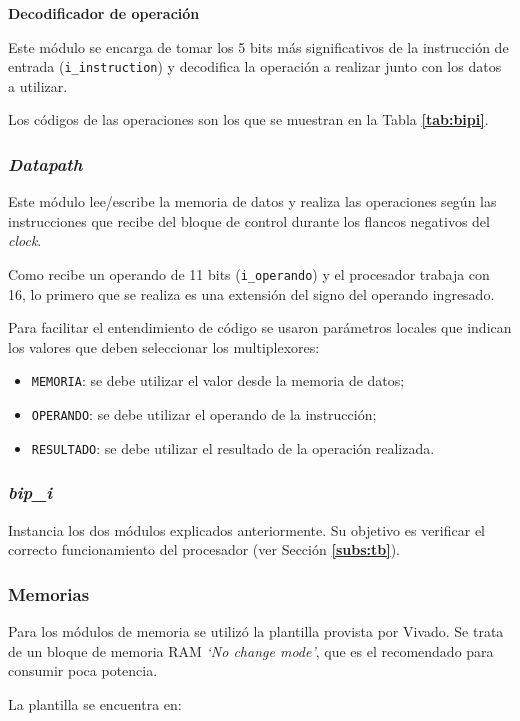 \documentclass[12pt,a4paper]{article}
\begin{document}
\textbf{Decodificador de operación}

Este módulo se encarga de tomar los 5 bits más significativos de la instrucción de entrada (\verb|i_instruction|) y decodifica la operación a realizar junto con los datos a utilizar. 

Los códigos de las operaciones son los que se muestran en la Tabla \textbf{\ref{tab:bipi}}.

\subsubsection{\emph{Datapath}}
\label{subss:datapath}
Este módulo lee/escribe la memoria de datos y realiza las operaciones según las instrucciones que recibe del bloque de control durante los flancos negativos del \emph{clock}.

Como recibe un operando de 11 bits (\verb|i_operando|) y el procesador trabaja con 16, lo primero que se realiza es una extensión del signo del operando ingresado.

Para facilitar el entendimiento de código se usaron parámetros locales que indican los valores que deben seleccionar los multiplexores:

\begin{itemize}
\item \verb|MEMORIA|: se debe utilizar el valor desde la memoria de datos;
\item \verb|OPERANDO|:  se debe utilizar el operando de la instrucción;
\item \verb|RESULTADO|: se debe utilizar el resultado de la operación realizada.
\end{itemize}

\subsubsection{\emph{bip\_i}}
\label{subss:bipi}
Instancia los dos módulos explicados anteriormente. Su objetivo es verificar el correcto funcionamiento del procesador (ver Sección \textbf{\ref{subs:tb}}).

\newpage
\subsubsection{Memorias}
\label{subss:memo}
Para los módulos de memoria se utilizó la plantilla provista por Vivado. Se trata de un bloque de memoria RAM \emph{`No change mode'}, que es el recomendado para consumir poca potencia.

La plantilla se encuentra en:
\end{document}
